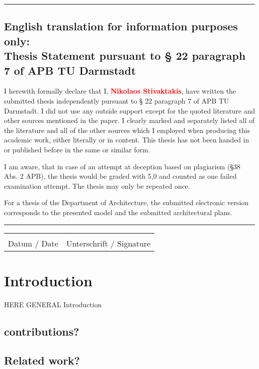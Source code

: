 \documentclass{cacthesis}
\begin{document}
	\vspace{10pt}
	\hrule
	
	\section*{English translation for information purposes only:\\Thesis Statement pursuant to § 22 paragraph 7 of APB TU Darmstadt}
	
	I herewith formally declare that I, \textcolor{red}{\textbf{Nikolaos Stivaktakis}}, have written the submitted thesis independently pursuant to § 22 paragraph 7 of APB TU Darmstadt. I did not use any outside support except for the quoted literature and other sources mentioned in the paper. I clearly marked and separately listed all of the literature and all of the other sources which I employed when producing this academic work, either literally or in content. This thesis has not been handed in or published before in the same or similar form.
	
	I am aware, that in case of an attempt at deception based on plagiarism (§38 Abs. 2 APB), the thesis would be graded with 5,0 and counted as one failed examination attempt. The thesis may only be repeated once.
	
	For a thesis of the Department of Architecture, the submitted electronic version corresponds to the presented model and the submitted architectural plans.
	
	\vspace{10pt}
	\hrule
	\vspace{70pt}
	
	\noindent\begin{tabular}{l@{\hskip 1in}l}
		\makebox[1.8in]{\hrulefill} & \makebox[3.5in]{\hrulefill}\\
		Datum / Date & Unterschrift / Signature
	\end{tabular}
	
	\listoffigures
	\listoftables
	\tableofcontents
	
	\mainmatter
	
	\chapter{Introduction}
	HERE GENERAL Introduction
	\section{contributions?}
\section{Related work?}
\end{document}
